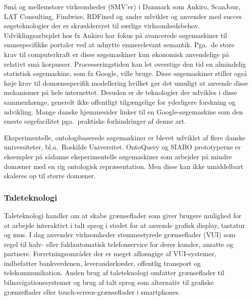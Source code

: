 \begin{multicols}{2}
\mbox{Sm\aa} og mellemstore virksomheder (SMV'er) i Danmark som Ankiro, ScanJour, LAT Consulting, Findwise, RDFined og andre udvikler og anvender med succes s\o geteknologier der er skr\ae ddersyet til s\ae rlige virksomhedsbehov. Udviklingsarbejdet hos fx Ankiro har fokus \mbox{p\aa} avancerede s\o gemaskiner til emnespecifikke portaler ved at udnytte emnerelevant semantik. Pga.\ de store krav til computerkraft er disse s\o gemaskiner kun \o konomisk anvendelige \mbox{p\aa} relativt \mbox{sm\aa} korpusser. Processeringstiden kan let overstige den tid en almindelig statistisk s\o gemaskine, som fx Google, ville bruge. Disse s\o gemaskiner stiller \mbox{ogs\aa} h\o je krav til dom\ae nespecifik modellering hvilket g\o r det umuligt at anvende disse mekanismer \mbox{p\aa} hele internettet. Desuden er de teknologier der udvikles i disse sammenh\ae nge, generelt ikke offentligt tilg\ae ngelige for yderligere forskning og udvikling. Mange danske hjemmesider linker til en Google-s\o gemaskine som den eneste s\o gefacilitet pga.\ praktiske forhindringer af denne art.

Eksperimentelle, ontologibaserede s\o ge\-maskiner er blevet udviklet af flere danske universiteter, bl.a.\ Roskilde Universitet. OntoQuery og SIABO prototyperne er eksempler \mbox{p\aa} s\aa danne eksperimentelle s\o gemaskiner som arbejder \mbox{p\aa} mindre dom\ae ner med en rig ontologisk repr\ae sentation.   Men disse kan ikke umiddelbart skaleres op til st\o rre dom\ae ner.
  
\subsubsection{Taleteknologi}

 Taleteknologi handler om at skabe gr\ae nseflader som giver brugere mulighed for at arbejde interaktivt i talt sprog i stedet for at anvende grafisk display, tastatur og mus. I dag anvender virksomheder stemmestyrede gr\ae nseflader (VUI) som regel til halv- eller fuldautomatisk telefonservice for deres kunder, ansatte og partnere. Forretningsomr\aa der der er meget afh\ae ngige af VUI-systemer, indbefatter bankverdenen, leverand\o rk\ae der, offentlig transport og telekommunikation. Anden brug af taleteknologi omfatter gr\ae nseflader til bilnavigations\-systemer og brug af talt sprog som alternativ til grafiske gr\ae nseflader eller touch-screen-gr\ae nseflader i smartphones. 



\end{multicols}
